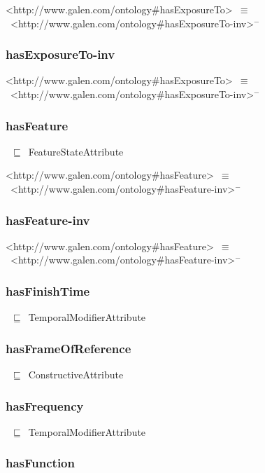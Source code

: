 \documentclass{article}
\begin{document}
<http://www.galen.com/ontology#hasExposureTo>~\ensuremath{\equiv}~<http://www.galen.com/ontology#hasExposureTo-inv>\ensuremath{^-}

\subsubsection*{hasExposureTo-inv}

<http://www.galen.com/ontology#hasExposureTo>~\ensuremath{\equiv}~<http://www.galen.com/ontology#hasExposureTo-inv>\ensuremath{^-}

\subsubsection*{hasFeature}

~\ensuremath{\sqsubseteq}~FeatureStateAttribute

<http://www.galen.com/ontology#hasFeature>~\ensuremath{\equiv}~<http://www.galen.com/ontology#hasFeature-inv>\ensuremath{^-}

\subsubsection*{hasFeature-inv}

<http://www.galen.com/ontology#hasFeature>~\ensuremath{\equiv}~<http://www.galen.com/ontology#hasFeature-inv>\ensuremath{^-}

\subsubsection*{hasFinishTime}

~\ensuremath{\sqsubseteq}~TemporalModifierAttribute

\subsubsection*{hasFrameOfReference}

~\ensuremath{\sqsubseteq}~ConstructiveAttribute

\subsubsection*{hasFrequency}

~\ensuremath{\sqsubseteq}~TemporalModifierAttribute

\subsubsection*{hasFunction}
\end{document}
